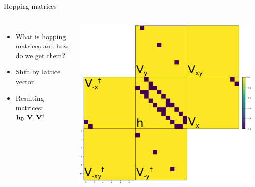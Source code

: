 \documentclass[hyperref={colorlinks=true,urlcolor=blue,linkcolor=.},aspectratio=1610,mathserif]{beamer}
\begin{document}
\begin{frame}{Hopping matrices}
	\centering
	\begin{columns}[c]
		\begin{itemize}
		    \item What is hopping matrices and how do we get them?
			\item Shift by lattice vector
			\item Resulting matrices: \(\vb{h_0}, \vb{V}, \vb{V}^{\dagger}\)
		\end{itemize}
		\includegraphics[width=.8\textwidth]{Figures/stitch.eps}
	\end{columns}
\end{frame}
\end{document}
